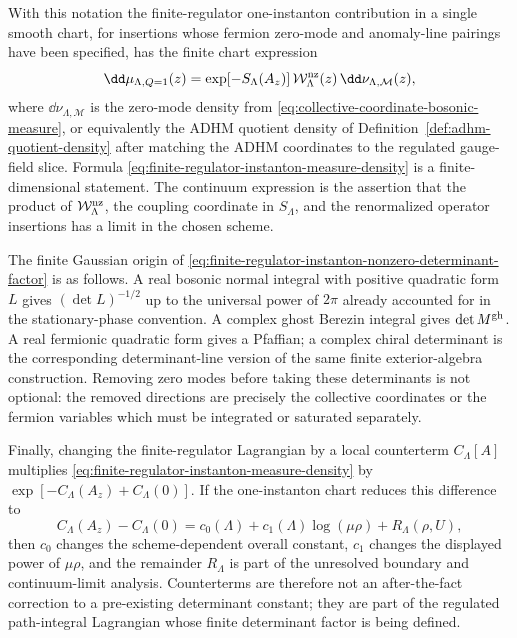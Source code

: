 With this notation the finite-regulator one-instanton contribution in a
single smooth chart, for insertions whose fermion zero-mode and anomaly-line
pairings have been specified, has the finite chart expression
\begin{equation}
  \dd\mu_{\Lambda,Q=1}(z)
  =
  \exp[-S_\Lambda(A_z)]\,
  \mathcal W_{\Lambda}^{\rm nz}(z)\,
  \dd\nu_{\Lambda,\mathcal M}(z),
  \label{eq:finite-regulator-instanton-measure-density}
\end{equation}
where \(\dd\nu_{\Lambda,\mathcal M}\) is the zero-mode density from
\eqref{eq:collective-coordinate-bosonic-measure}, or equivalently the ADHM
quotient density of Definition~\ref{def:adhm-quotient-density} after matching
the ADHM coordinates to the regulated gauge-field slice.  Formula
\eqref{eq:finite-regulator-instanton-measure-density} is a finite-dimensional
statement.  The continuum expression is the assertion that the product of
\(\mathcal W_{\Lambda}^{\rm nz}\), the coupling coordinate in
\(S_\Lambda\), and the renormalized operator insertions has a limit in the
chosen scheme.

The finite Gaussian origin of
\eqref{eq:finite-regulator-instanton-nonzero-determinant-factor} is as
follows.  A real bosonic normal integral with positive quadratic form \(L\)
gives \((\det L)^{-1/2}\) up to the universal power of \(2\pi\) already
accounted for in the stationary-phase convention.  A complex ghost Berezin
integral gives \(\det M^{\rm gh}\).  A real fermionic quadratic form gives a
Pfaffian; a complex chiral determinant is the corresponding determinant-line
version of the same finite exterior-algebra construction.  Removing zero
modes before taking these determinants is not optional: the removed
directions are precisely the collective coordinates or the fermion variables
which must be integrated or saturated separately.

Finally, changing the finite-regulator Lagrangian by a local counterterm
\(C_\Lambda[A]\) multiplies
\eqref{eq:finite-regulator-instanton-measure-density} by
\(\exp[-C_\Lambda(A_z)+C_\Lambda(0)]\).  If the one-instanton chart reduces
this difference to
\[
  C_\Lambda(A_z)-C_\Lambda(0)
  =
  c_0(\Lambda)+c_1(\Lambda)\log(\mu\rho)
  +R_\Lambda(\rho,U),
\]
then \(c_0\) changes the scheme-dependent overall constant, \(c_1\) changes
the displayed power of \(\mu\rho\), and the remainder \(R_\Lambda\) is part
of the unresolved boundary and continuum-limit analysis.  Counterterms are
therefore not an after-the-fact correction to a pre-existing determinant
constant; they are part of the regulated path-integral Lagrangian whose
finite determinant factor is being defined.

